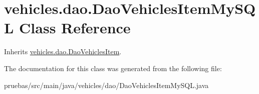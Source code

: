 \hypertarget{classvehicles_1_1dao_1_1_dao_vehicles_item_my_s_q_l}{}\section{vehicles.\+dao.\+Dao\+Vehicles\+Item\+My\+S\+QL Class Reference}
\label{classvehicles_1_1dao_1_1_dao_vehicles_item_my_s_q_l}


Inherits \mbox{\hyperlink{interfacevehicles_1_1dao_1_1_dao_vehicles_item}{vehicles.\+dao.\+Dao\+Vehicles\+Item}}.



The documentation for this class was generated from the following file\+:\begin{DoxyCompactItemize}
\item 
pruebas/src/main/java/vehicles/dao/Dao\+Vehicles\+Item\+My\+S\+Q\+L.\+java\end{DoxyCompactItemize}
